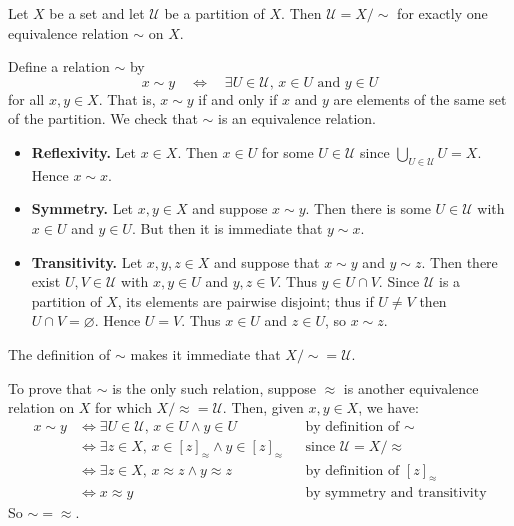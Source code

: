 \begin{proposition}
\label{propPartitionIsQuotientByEquivalenceRelation}
Let $X$ be a set and let $\mathcal{U}$ be a partition of $X$. Then $\mathcal{U}=X/{\sim}$ for exactly one equivalence relation $\sim$ on $X$.
\end{proposition}
\begin{cproof}
Define a relation $\sim$ by
\[ x \sim y \quad \Leftrightarrow \quad \exists U \in \mathcal{U},\, x \in U \text{ and } y \in U \]
for all $x,y \in X$. That is, $x \sim y$ if and only if $x$ and $y$ are elements of the same set of the partition. We check that $\sim$ is an equivalence relation.
\begin{itemize}
\item \textbf{Reflexivity.} Let $x \in X$. Then $x \in U$ for some $U \in \mathcal{U}$ since $\bigcup_{U \in \mathcal{U}} U = X$. Hence $x \sim x$.
\item \textbf{Symmetry.} Let $x,y \in X$ and suppose $x \sim y$. Then there is some $U \in \mathcal{U}$ with $x \in U$ and $y \in U$. But then it is immediate that $y \sim x$.
\item \textbf{Transitivity.} Let $x,y,z \in X$ and suppose that $x \sim y$ and $y \sim z$. Then there exist $U,V \in \mathcal{U}$ with $x,y \in U$ and $y,z \in V$. Thus $y \in U \cap V$. Since $\mathcal{U}$ is a partition of $X$, its elements are pairwise disjoint; thus if $U \ne V$ then $U \cap V = \varnothing$. Hence $U=V$. Thus $x \in U$ and $z \in U$, so $x \sim z$.
\end{itemize}
The definition of $\sim$ makes it immediate that $X/{\sim} = \mathcal{U}$.

To prove that $\sim$ is the only such relation, suppose $\approx$ is another equivalence relation on $X$ for which $X/{\approx}=\mathcal{U}$. Then, given $x,y \in X$, we have:
\begin{align*}
x \sim y & \Leftrightarrow \exists U \in \mathcal{U},\, x \in U \wedge y \in U && \text{by definition of $\sim$} \\
& \Leftrightarrow \exists z \in X,\, x \in [z]_{\approx} \wedge y \in [z]_{\approx} && \text{since $\mathcal{U} = X/{\approx}$} \\
& \Leftrightarrow \exists z \in X,\, x \approx z \wedge y \approx z && \text{by definition of $[z]_{\approx}$} \\
& \Leftrightarrow x \approx y && \text{by symmetry and transitivity}
\end{align*}
So ${\sim} = {\approx}$.
\end{cproof}

